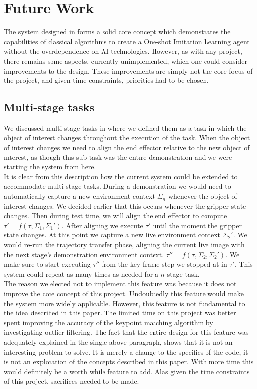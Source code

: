 \chapter{Future Work}
\label{chap:future}

The system designed in  forms a solid core concept which demonstrates the capabilities of classical algorithms to create a One-shot Imitation Learning agent without the overdependence on AI technologies. However, as with any project, there remains some aspects, currently unimplemented, which one could consider improvements to the design. These improvements are simply not the core focus of the project, and given time constraints, priorities had to be chosen.

\section{Multi-stage tasks}
We discussed multi-stage tasks in  where we defined them as a task in which the object of interest changes throughout the execution of the task. When the object of interest changes we need to align the end effector relative to the new object of interest, as though this sub-task was the entire demonstration and we were starting the system from here.\\

It is clear from this description how the current system could be extended to accommodate multi-stage tasks. During a demonstration we would need to automatically capture a new environment context $\Sigma_n$ whenever the object of interest changes. We decided earlier that this occurs whenever the gripper state changes. Then during test time, we will align the end effector to compute $\tau' = f(\tau, \Sigma_1, \Sigma_1')$. After aligning we execute $\tau'$ until the moment the gripper state changes. At this point we capture a new live environment context $\Sigma_2'$. We would re-run the trajectory transfer phase, aligning the current live image with the next stage's demonstration environment context. $\tau'' = f(\tau, \Sigma_2, \Sigma_2')$. We make sure to start executing $\tau''$ from the key frame step we stopped at in $\tau'$. This system could repeat as many times as needed for a $n$-stage task.\\

The reason we elected not to implement this feature was because it does not improve the core concept of this project. Undoubtedly this feature would make the system more widely applicable. However, this feature is not fundamental to the idea described in this paper. The limited time on this project was better spent improving the accuracy of the keypoint matching algorithm by investigating outlier filtering. The fact that the entire design for this feature was adequately explained in the single above paragraph, shows that it is not an interesting problem to solve. It is merely a change to the specifics of the code, it is not an exploration of the concepts described in this paper. With more time this would definitely be a worth while feature to add. Alas given the time constraints of this project, sacrifices needed to be made.

